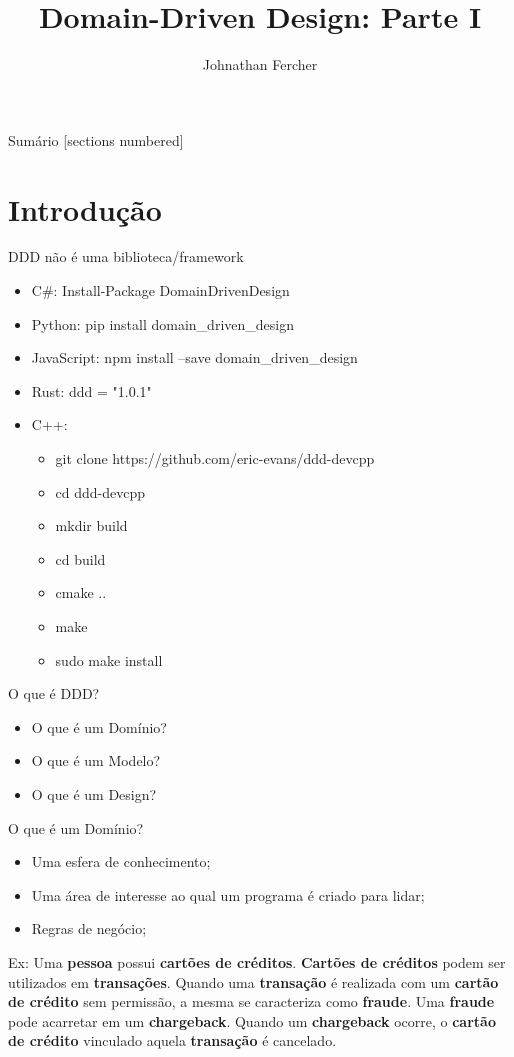 \documentclass[aspectratio=169]{beamer}
\title{Domain-Driven Design: Parte I}
\date{}
\author{Johnathan Fercher}
\newcommand{\ubiquitouslanguagesample}{Ex: Uma \textbf{pessoa} possui \textbf{cartões de créditos}. \textbf{Cartões de créditos} podem ser utilizados em \textbf{transações}. Quando uma \textbf{transação} é realizada com um \textbf{cartão de crédito} sem permissão, a mesma se caracteriza como \textbf{fraude}. Uma \textbf{fraude} pode acarretar em um \textbf{chargeback}. Quando um \textbf{chargeback} ocorre, o \textbf{cartão de crédito} vinculado aquela \textbf{transação} é cancelado.}
\begin{document}
\maketitle

\begin{frame}{Sumário}
  [sections numbered]
  \tableofcontents[hideallsubsections]
\end{frame}

\section{Introdução}
\begin{frame}{DDD não é uma biblioteca/framework}	
	\begin{itemize}	
		\item C\#: Install-Package DomainDrivenDesign
		\item Python: pip install domain\_driven\_design
		\item JavaScript: npm install --save domain\_driven\_design
		\item Rust: ddd = "1.0.1"
		\item C++: 
		\begin{itemize}	
			\item git clone https://github.com/eric-evans/ddd-devcpp
			\item cd ddd-devcpp
			\item mkdir build
			\item cd build
			\item cmake ..
			\item make
			\item sudo make install
		\end{itemize}
	\end{itemize}
\end{frame}

\begin{frame}{O que é DDD?}	
	\begin{itemize}	
		\item O que é um Domínio?
		\item O que é um Modelo?
		\item O que é um Design?
	\end{itemize}
\end{frame}

\begin{frame}{O que é um Domínio?}	
	\begin{itemize}	
		\item Uma esfera de conhecimento;
		\item Uma área de interesse ao qual um programa é criado para lidar;
		\item Regras de negócio;
	\end{itemize}

	\ubiquitouslanguagesample
\end{frame}
\end{document}
